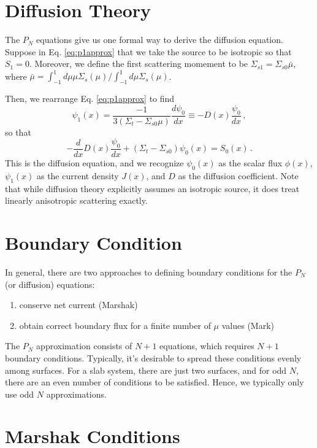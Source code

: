 \section*{Diffusion Theory}

The $P_N$ equations give us one formal way to derive the diffusion equation.  Suppose in Eq. \ref{eq:p1approx} that we take the source to be isotropic so that $S_1 = 0$.  Moreover, we define the first scattering momement to be $\Sigma_{s1} = \Sigma_{s0}\bar{\mu}$, where $\bar{\mu} = \int^1_{-1}d\mu \mu \Sigma_s(\mu) / \int^1_{-1} d\mu \Sigma_s(\mu)$.

Then, we rearrange Eq. \ref{eq:p1approx} to find
\begin{equation}
 \psi_1 (x) = \frac{-1}{3(\Sigma_t - \Sigma_{s0}\mu)} \frac{d\psi_0}{dx} \equiv -D(x) \frac{\psi_0}{dx} \, ,
\end{equation}
so that 
\begin{equation}
 -\frac{d}{dx} D(x) \frac{\psi_0}{dx} + (\Sigma_t - \Sigma_{s0})\psi_0(x) = S_0 (x) \, .
\label{eq:neutrondiffusion}
\end{equation}
This is the diffusion equation, and we recognize $\psi_0(x)$ as the scalar flux $\phi(x)$, $\psi_1(x)$ as the current density $J(x)$, and $D$ as the diffusion coefficient.  Note that while diffusion theory explicitly assumes an isotropic source, it does treat linearly anisotropic scattering exactly.

\section*{Boundary Condition}

In general, there are two approaches to defining boundary conditions for the $P_N$ (or diffusion) equations:
\begin{enumerate}
 \item conserve net current (Marshak)
 \item obtain correct boundary flux for a finite number of $\mu$ values (Mark)
\end{enumerate}
The $P_N$ approximation consists of $N+1$ equations, which requires $N+1$ boundary conditions.  Typically, it's desirable to spread these conditions evenly among surfaces.  For a slab system, there are just two surfaces, and for odd $N$, there are an even number of conditions to be satisfied.  Hence, we typically only use odd $N$ approximations.

\section*{Marshak Conditions}

